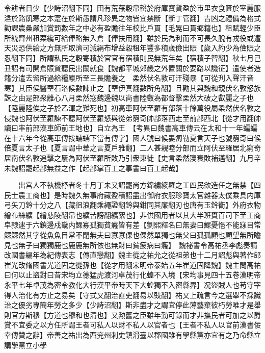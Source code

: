令耕者日少【少詩沼翻下同】田有荒蕪穀帛罄於府庫寶貨盈於市里衣食匱於室麗服溢於路飢寒之本寔在於斯愚謂凡珍異之物皆宜禁斷【斷丁管翻】吉凶之禮備為格式勸課農桑嚴加賞罰數年之中必有盈贍往年校比戶貫【毛晃曰貫鄉籍也】租賦輕少臣所統齊州租粟纔可給俸略無入倉【俸扶用翻】雖於民為利而不可長久脫有戎役或遭天災恐供給之方無所取濟可減絹布增益穀租年豐多積歲儉出賑【歲入約少為儉賑之忍翻下同】所謂私民之穀寄積於官官有宿積則民無荒年矣【宿積子智翻】秋七月己丑詔有司開倉賑貸聽民出關就食【魏都平城郊畿之外置關於要路以譏征】遣使者造籍分遣去留所過給糧廪所至三長贍養之　柔然伏名敦可汗殘暴【可從刋入聲汗音寒】其臣侯醫垔石洛候數諫止之【垔伊真翻數所角翻】且勸其與魏和親伏名敦怒族誅之由是部衆離心八月柔然寇魏邊魏以尚書陸叡為都督擊柔然大破之叡麗之子也【陸麗陸俟之子於乙渾之難死也】初高車阿伏至羅有部落十餘萬役屬柔然伏名敦之侵魏也阿伏至羅諫不聽阿伏至羅怒與從弟窮奇帥部落西走至前部西北【從才用翻帥讀曰率前部漢車師前王地也】自立為王　【考異曰魏書高車傳云在太和十一年蠕蠕在十六年今從高車傳按蠕蠕下當有傳字】國人號曰候婁匐勒夏言天子也號窮奇曰候倍夏言太子也【夏言謂中華之言夏戶雅翻】二人甚親睦分部而立阿伏至羅居北窮奇居南伏名敦追擊之屢為阿伏至羅所敗乃引衆東徙【史言柔然寖衰敗補邁翻】九月辛未魏詔罷起部無益之作【起部掌百工之事書曰百工起哉】

　　出宫人不執機杼者冬十月丁未又詔罷尚方錦繡綾羅之工四民欲造任之無禁【四民士農工商也】是時魏久無事府藏盈積詔盡出御府衣服珍寶太官雜器太僕乘具内庫弓矢刀鈐十分之八【藏徂浪翻乘繩證翻鈐與鉗同其廉翻刃也唐有玉鈐衛】外府衣物繒布絲纊【繒慈陵翻帛也纊苦謗翻纊絮也】非供國用者以其大半班賚百司下至工商皁隸逮于六鎮邊戍畿内鰥寡孤獨貧癃皆有差【劉熙釋名曰無妻曰鰥憂悒不能寐目常鰥鰥然其字從魚魚目常不閉無夫曰寡寡倮也倮然單獨也無父曰孤孤顧也顧望無所瞻見也無子曰獨獨鹿也鹿鹿無所依也無財曰貧疲病曰癃】　魏袐書令高祐丞李彪奏請改國書編年為紀傳表志【傳直戀翻】魏主從之祐允之從祖弟也十二月詔彪與著作郎崔光改脩國書光道固之從孫也【從才用翻宋明帝泰始五年崔道固降魏】魏主問高祐曰何以止盜對曰昔宋均立德猛虎渡河卓茂行化蝗不入境【宋均事見四十五卷漢明帝永平七年卓茂為密令教化大行漢平帝時天下大蝗獨不入密縣界】况盜賊人也苟守宰得人治化有方止之易矣【守式又翻治直吏翻易以豉翻】祐又上疏言今之選舉不採識治之優劣專簡年勞之多少【少詩沼翻】斯非盡才之謂宜停此薄藝棄彼朽勞唯才是舉則官方斯穆【方道也穆和也清也】又勲舊之臣雖年勤可錄而才非撫民者可加之以爵賞不宜委之以方任所謂王者可私人以財不私人以官者也【王者不私人以官前漢書佞幸傳贊之辭】帝善之祐出為西兖州刺史鎮滑臺以郡國雖有學縣黨亦宜有之乃命縣立講學黨立小學

